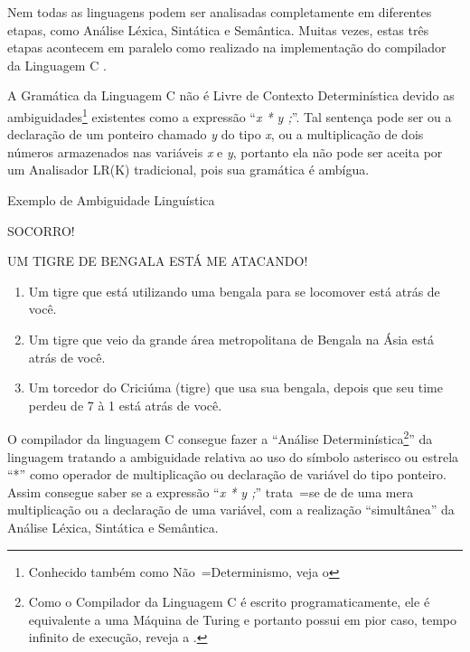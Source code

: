 {    Nem todas as linguagens podem ser analisadas completamente em diferentes etapas,
    como Análise Léxica, Sintática e Semântica. Muitas vezes,
    estas três etapas acontecem em paralelo como realizado na implementação do compilador da Linguagem C \cite{jourdan2017,whyCcannotBeParsedWithALR1Parser}.

    A Gramática da Linguagem C não é Livre de Contexto Determinística devido as ambiguidades\footnote{
    Conhecido também como Não~=Determinismo,
    veja o 
    }
    existentes como a expressão ``\textit{x * y ;}''.
    Tal sentença pode ser ou
    a declaração de um ponteiro chamado \textit{y} do tipo \textit{x},
    ou a multiplicação de dois números armazenados nas variáveis \textit{x} e
    \textit{y},
    portanto ela não pode ser aceita por um Analisador LR(K) tradicional,
    pois sua gramática é ambígua.

\begin{quadro}[h]
\caption{Exemplo de Ambiguidade Linguística}
\label{exemploDeAmbiguidadeLinguistica}
\begin{bluebox}
    SOCORRO!

    UM TIGRE DE BENGALA ESTÁ ME ATACANDO!

    \begin{enumerate}%
        \item Um tigre que está utilizando uma bengala para se locomover está atrás de você.
        \item Um tigre que veio da grande área metropolitana de Bengala na Ásia está atrás de você.
        \item Um torcedor do Criciúma (tigre) que usa sua bengala,
        depois que seu time perdeu de 7 à 1 está atrás de você.
    \end{enumerate}
\end{bluebox}
\end{quadro}

    O compilador da linguagem C consegue fazer a ``Análise Determinística\footnote{
    Como o Compilador da Linguagem C é escrito programaticamente,
    ele é equivalente a uma Máquina de Turing e
    portanto possui em pior caso,
    tempo infinito de execução,
    reveja a .
    }'' da linguagem tratando a ambiguidade relativa ao uso do símbolo asterisco ou
    estrela ``*'' como operador de multiplicação ou
    declaração de variável do tipo ponteiro.
    Assim consegue saber se a expressão ``\textit{x * y ;}'' trata~=se de de uma mera multiplicação ou
    a declaração de uma variável,
    com a realização ``simultânea'' da Análise Léxica,
    Sintática e
    Semântica.

}
